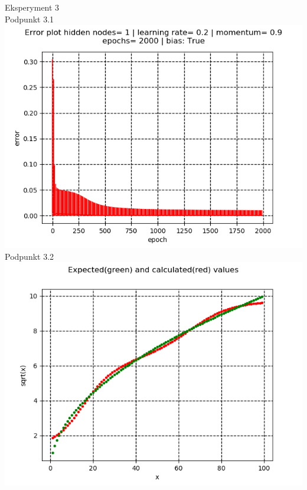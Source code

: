 \documentclass{classrep}
\begin{document}
{Eksperyment 3\\
Podpunkt 3.1\\
\includegraphics[scale=0.8]{imgs/3_1.png}\\
Podpunkt 3.2\\
\includegraphics[scale=0.8]{imgs/3_2.png}\\
}
\end{document}
